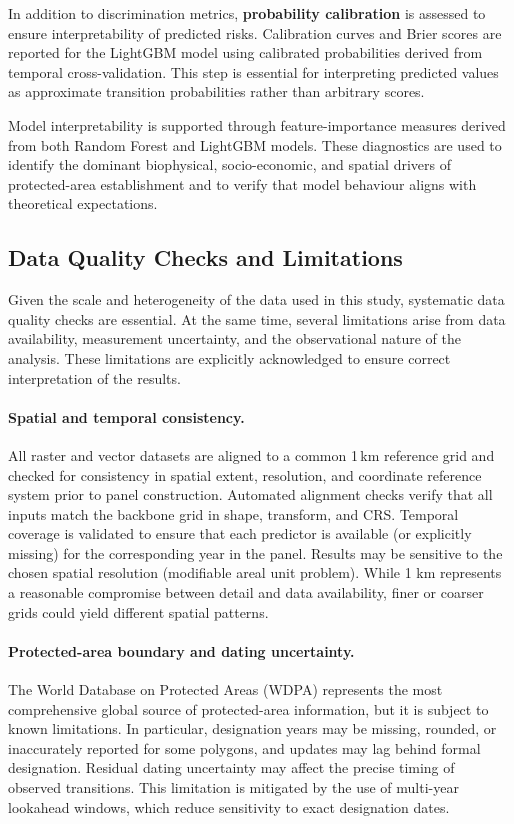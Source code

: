 \documentclass[12pt]{article}
\theoremstyle{break} %
\begin{document}
In addition to discrimination metrics, \textbf{probability calibration} is assessed to ensure interpretability of predicted risks. Calibration curves and Brier scores are reported for the LightGBM model using calibrated probabilities derived from temporal cross-validation. This step is essential for interpreting predicted values as approximate transition probabilities rather than arbitrary scores.

Model interpretability is supported through feature-importance measures derived from both Random Forest and LightGBM models. These diagnostics are used to identify the dominant biophysical, socio-economic, and spatial drivers of protected-area establishment and to verify that model behaviour aligns with theoretical expectations.

\subsection{Data Quality Checks and Limitations}
\label{limitations}

Given the scale and heterogeneity of the data used in this study, systematic data quality checks are essential. At the same time, several limitations arise from data availability, measurement uncertainty, and the observational nature of the analysis. These limitations are explicitly acknowledged to ensure correct
interpretation of the results.

\paragraph{Spatial and temporal consistency.}
All raster and vector datasets are aligned to a common 1\,km reference grid and checked for consistency in spatial extent, resolution, and coordinate reference system prior to panel construction. Automated alignment checks verify that all inputs match the backbone grid in shape, transform, and CRS. Temporal coverage is validated to ensure that each predictor is available (or explicitly missing) for the corresponding year in the panel. Results may be sensitive to the chosen spatial resolution (modifiable areal unit problem). While 1 km represents a reasonable compromise between detail and data availability, finer or coarser grids could yield different spatial patterns.

\paragraph{Protected-area boundary and dating uncertainty.}
The World Database on Protected Areas (WDPA) represents the most comprehensive global source of protected-area information, but it is subject to known limitations. In particular, designation years may be missing, rounded, or inaccurately reported for some polygons, and updates may lag behind formal designation. Residual dating uncertainty may affect the precise timing of observed transitions. This limitation is mitigated by the use of multi-year lookahead windows, which reduce sensitivity to exact designation
dates.
\end{document}
